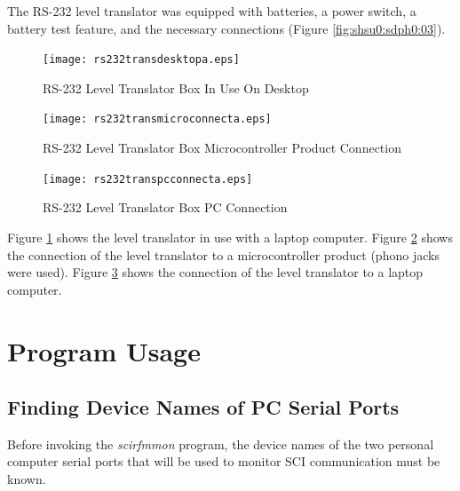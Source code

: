 \documentclass[letterpaper,10pt,titlepage]{article}
\newcommand{\productname}{scirfmmon}
\newcommand{\productnameemph}{\emph{\productname}}
\begin{document}
The RS-232 level translator was equipped with batteries, a power switch, 
a battery test feature,
and the necessary connections (Figure \ref{fig:shsu0:sdph0:03}).

\begin{figure}
\centering
\texttt{[image: rs232transdesktopa.eps]}
\caption{RS-232 Level Translator Box In Use On Desktop}
\label{fig:shsu0:sdph0:04}
\end{figure}

\begin{figure}
\centering
\texttt{[image: rs232transmicroconnecta.eps]}
\caption{RS-232 Level Translator Box Microcontroller Product Connection}
\label{fig:shsu0:sdph0:05}
\end{figure}

\begin{figure}
\centering
\texttt{[image: rs232transpcconnecta.eps]}
\caption{RS-232 Level Translator Box PC Connection}
\label{fig:shsu0:sdph0:06}
\end{figure}

Figure \ref{fig:shsu0:sdph0:04} shows the level translator in use with a laptop computer.
Figure \ref{fig:shsu0:sdph0:05} shows the connection of the level translator to a
microcontroller product (phono jacks were used).
Figure \ref{fig:shsu0:sdph0:06} shows the connection of the level translator
to a laptop computer.


\section{Program Usage}
\label{susg0}


\subsection{Finding Device Names of PC Serial Ports}
\label{susg0:sfdn0}

Before invoking the \productnameemph{} program, the device names of 
the two personal computer serial ports that will be used
to monitor SCI communication must be known.
\end{document}
